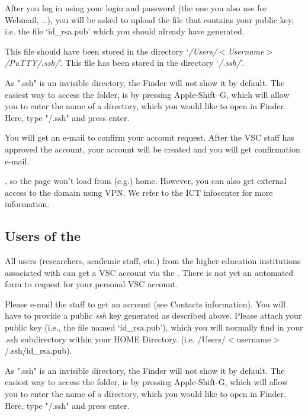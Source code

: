 After you log in using your \university login and password (the one you also
use for Webmail, \ldots ), you will be asked to upload the file that contains
your public key, i.e. the file `id\_rsa.pub' which you should already have
generated.

\ifwindows
  This file should have been stored in the directory
  `\emph{/Users/$<$Username$>$/PuTTY/.ssh/}'.
\fi
\ifmacORlinux
  This file has been stored in the directory `\emph{\tilde/.ssh/}'.
\fi

\ifmac
   As ".ssh" is an invisible directory, the Finder will
  not show it by default. The easiest way to access the folder, is by pressing
  Apple-Shift--G, which will allow you to enter the name of a directory, which
  you would like to open in Finder. Here, type "\tilde/.ssh" and press enter.
\fi

You will get an e-mail to confirm your account request. After the VSC staff has
approved the account, your account will be created and you will get
confirmation e-mail.

\ifantwerpen %
, so the page won't load from (e.g.) home. However, you can also get
external access to the \university domain using VPN. We refer to the \university ICT infocenter
for more information.

\subsection{Users of the \association}
\label{sec:users-of-association}

All users (researchers, academic staff, etc.) from the higher education
institutions associated with \university can get a VSC account via the \university. There is not
yet an automated form to request for your personal VSC account.

Please e-mail the \hpc staff to get an account (see Contacts information).
You will have to provide a public \emph{ssh} key generated as described
above. Please attach your public key (i.e., the file named `id\_rsa.pub'),
which you will normally find in your .ssh subdirectory within your HOME
Directory. (i.e. /Users/$<$username$>$/.ssh/id\_rsa.pub).


\ifmac %

   As ".ssh" is an invisible directory, the Finder will
  not show it by default. The easiest way to access the folder, is by pressing
  Apple-Shift-G, which will allow you to enter the name of a directory, which
  you would like to open in Finder. Here, type "\tilde/.ssh" and press enter.

